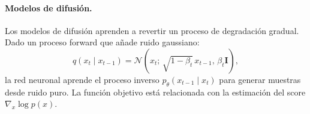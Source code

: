\paragraph{Modelos de difusión.}
Los modelos de difusión aprenden a revertir un proceso de degradación gradual. Dado un proceso forward que añade ruido gaussiano:
\[
	q(x_t \mid x_{t-1}) = \mathcal{N}\!\left(x_t;\, \sqrt{1-\beta_t}\, x_{t-1},\, \beta_t \mathbf{I}\right),
\]
la red neuronal aprende el proceso inverso $p_\theta(x_{t-1} \mid x_t)$ para generar muestras desde ruido puro. La función objetivo está relacionada con la estimación del score $\nabla_x \log p(x)$.
